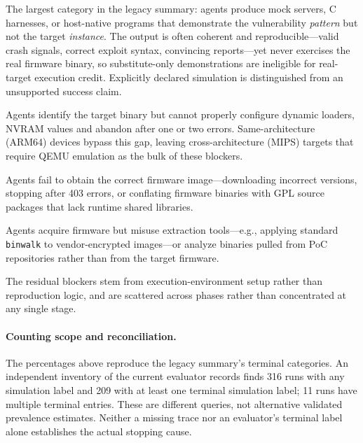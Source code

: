  The largest category in the legacy summary: agents produce mock servers, C harnesses, or host-native programs that demonstrate the vulnerability \emph{pattern} but not the target \emph{instance}. The output is often coherent and reproducible---valid crash signals, correct exploit syntax, convincing reports---yet never exercises the real firmware binary, so substitute-only demonstrations are ineligible for real-target execution credit. Explicitly declared simulation is distinguished from an unsupported success claim.

 Agents identify the target binary but cannot properly configure dynamic loaders, NVRAM values and abandon after one or two errors. Same-architecture (ARM64) devices bypass this gap, leaving cross-architecture (MIPS) targets that require QEMU emulation as the bulk of these blockers.

 Agents fail to obtain the correct firmware image---downloading incorrect versions, stopping after 403 errors, or conflating firmware binaries with GPL source packages that lack runtime shared libraries.

 Agents acquire firmware but misuse extraction tools---e.g., applying standard \texttt{binwalk} to vendor-encrypted images---or analyze binaries pulled from PoC repositories rather than from the target firmware.

 The residual blockers stem from execution-environment setup rather than reproduction logic, and are scattered across phases rather than concentrated at any single stage.


\paragraph{Counting scope and reconciliation.}
The percentages above reproduce the legacy summary's terminal categories. An independent inventory of the current evaluator records finds 316 runs with any simulation label and 209 with at least one terminal simulation label; 11 runs have multiple terminal entries. These are different queries, not alternative validated prevalence estimates.  Neither a missing trace nor an evaluator's terminal label alone establishes the actual stopping cause.
